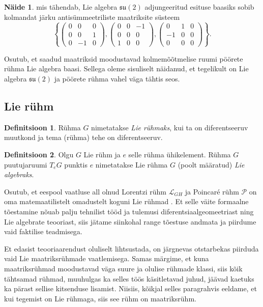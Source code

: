 \documentclass[12pt,a4paper,oneside]{article}
\theoremstyle{plain}
\theoremstyle{definition}
\newtheorem{definitsioon}{Definitsioon}[section]
\newtheorem{naide}{Näide}[section]
\numberwithin{equation}{section}
\def\L{{\mathcal L}}
\def\P{{\mathcal P}}
\def\su2{{\mathfrak{ su}\left(2\right)}}
\begin{document}
\begin{naide}
mis tähendab, Lie algebra $\su2$ adjungeeritud esituse baasiks sobib 
kolmandat järku antisümmeetriliste maatriksite süsteem 
\[\left\lbrace \begin{pmatrix}
0 & 0 & 0 \\
0 & 0 & 1 \\
0 & -1 & 0
\end{pmatrix}, \begin{pmatrix}
0 & 0 & -1 \\
0 & 0 & 0 \\
1 & 0 & 0
\end{pmatrix}, \begin{pmatrix}
0 & 1 & 0 \\
-1 & 0 & 0 \\
0 & 0 & 0
\end{pmatrix} \right\rbrace.\]
\end{naide}

Osutub, et saadud maatriksid moodustavad kolmemõõtmelise ruumi 
pöörete rühma Lie algebra baasi. Sellega oleme sisuliselt näidanud, 
et tegelikult on Lie algebra $\su2$ ja pöörete rühma vahel väga 
tähtis seos.

\subsection{Lie rühm} \label{ptk:lie_ryhm}

\begin{definitsioon}
Rühma $G$ nimetatakse \emph{Lie rühmaks}, kui ta on diferentseeruv 
muutkond ja tema (rühma) tehe on diferentseeruv.
\end{definitsioon}

\begin{definitsioon}
Olgu $G$ Lie rühm ja $e$ selle rühma ühikelement. Rühma $G$ 
puutujaruumi $T_e G$ punktis $e$ nimetatakse Lie rühma $G$ (poolt 
määratud) \emph{Lie algebraks}.
\end{definitsioon}

Osutub, et eespool vaatluse all olnud Lorentzi rühm $\L_{GH}$ ja 
Poincar\'e rühm $\P$ on oma matemaatilistelt omadustelt koguni Lie 
rühmad \cite[peatükk Poincar\'e algebra]{Super}. Et selle väite 
formaalne tõestamine nõuab palju tehnilist tööd ja tulemusi 
diferentsiaalgeomeetriast ning Lie algebrate teooriast, siis jätame 
siinkohal range tõestuse andmata ja piirdume vaid faktilise 
teadmisega.

Et edasist teooriaarendust oluliselt lihtsustada, on järgnevas 
otstarbekas piirduda vaid Lie maatriksrühmade vaatlemisega. Samas 
märgime, et kuna maatriksrühmad moodustavad väga suure ja olulise 
rühmade klassi, siis kõik tähtsamad rühmad, muuhulgas ka selles töös 
käsitletavad juhud, jäävad kaetuks ka pärast sellise kitsenduse 
lisamist. Niisiis, kõikjal selles paragrahvis eeldame, et kui 
tegemist on Lie rühmaga, siis see rühm on maatriksrühm.
\end{document}
